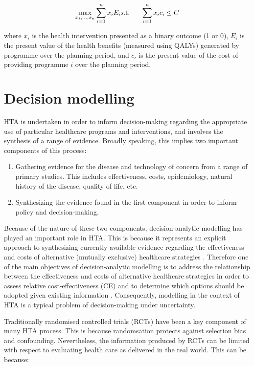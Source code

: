 \documentclass[
]{book}
\begin{document}
\[
\max_{x_i,\dots,x_n}\sum_{i=1}^n x_iE_i\\
\text{s.t.}\ \ \ \ \ \sum_{i=1}^n x_ic_i\leq C
\]

where \(x_i\) is the health intervention presented as a binary outcome (1 or 0), \(E_i\) is the present value of the health benefits (measured using QALYs) generated by programme over the planning period, and \(c_i\) is the present value of the cost of providing programme \(i\) over the planning period.

\hypertarget{decision-modelling}{%
\section{Decision modelling}\label{decision-modelling}}

HTA is undertaken in order to inform decision-making regarding the appropriate use of particular healthcare programs and interventions, and involves the synthesis of a range of evidence. Broadly speaking, this implies two important components of this process:

\begin{enumerate}
\def\labelenumi{\arabic{enumi}.}
\item
  Gathering evidence for the disease and technology of concern from a range of primary studies. This includes effectiveness, costs, epidemiology, natural history of the disease, quality of life, etc.
\item
  Synthesizing the evidence found in the first component in order to inform policy and decision-making.
\end{enumerate}

Because of the nature of these two components, decision-analytic modelling has played an important role in HTA. This is because it represents an explicit approach to synthesizing currently available evidence regarding the effectiveness and costs of alternative (mutually exclusive) healthcare strategies \citep{philips2006good}. Therefore one of the main objectives of decision-analytic modelling is to address the relationship between the effectiveness and costs of alternative healthcare strategies in order to assess relative cost-effectiveness (CE) and to determine which options should be adopted given existing information \citep{philips2006good}. Consequently, modelling in the context of HTA is a typical problem of decision-making under uncertainty.

Traditionally randomised controlled trials (RCTs) have been a key component of many HTA process. This is because randomsation protects against selection bias and confounding. Nevertheless, the information produced by RCTs can be limited with respect to evaluating health care as delivered in the real world. This can be because:
\end{document}
